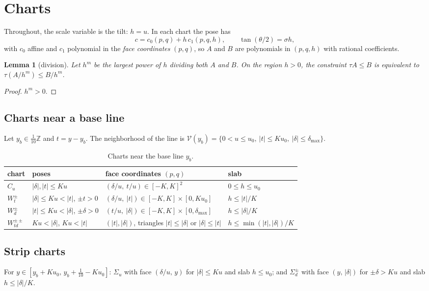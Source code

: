 \documentclass[11pt]{amsart}
\newtheorem{lemma}[theorem]{Lemma}
\theoremstyle{definition}
\theoremstyle{remark}
\newcommand{\Z}{\mathbb Z}
\begin{document}
\section{Charts}\label{sec:charts}

Throughout, the scale variable is the tilt: $h=u$. In each chart the pose has
\[
c=c_0(p,q)+h\,c_1(p,q,h),\qquad \tan(\theta/2)=\sigma h,
\]
with $c_0$ affine and $c_1$ polynomial in the \emph{face coordinates} $(p,q)$, so $A$ and $B$ are polynomials in
$(p,q,h)$ with rational coefficients.

\begin{lemma}[division]\label{lem:division}
Let $h^m$ be the largest power of $h$ dividing both $A$ and $B$. On the region $h>0$, the constraint $\tau A\le B$ is
equivalent to $\tau(A/h^m)\le B/h^m$.
\end{lemma}

\begin{proof}
$h^m>0$.
\end{proof}

\subsection{Charts near a base line}
Let $y_b\in\frac1{10}\Z$ and $t=y-y_b$. The neighborhood of the line is
$\mathcal V(y_b)=\{0<u\le u_0,\ |t|\le Ku_0,\ |\delta|\le\delta_{\max}\}$.

\begin{table}[h]
\begin{tabular}{llll}
\toprule
chart & poses & face coordinates $(p,q)$ & slab \\
\midrule
$C_u$ & $|\delta|,|t|\le Ku$ & $(\delta/u,\ t/u)\in[-K,K]^2$ & $0\le h\le u_0$\\
$W_t^\pm$ & $|\delta|\le Ku<|t|$, $\pm t>0$ & $(\delta/u,\ |t|)\in[-K,K]\times[0,Ku_0]$ & $h\le|t|/K$\\
$W_d^\pm$ & $|t|\le Ku<|\delta|$, $\pm\delta>0$ & $(t/u,\ |\delta|)\in[-K,K]\times[0,\delta_{\max}]$ & $h\le|\delta|/K$\\
$W_{td}^{\pm\pm}$ & $Ku<|\delta|$, $Ku<|t|$ & $(|t|,|\delta|)$, triangles $|t|\le|\delta|$ or $|\delta|\le|t|$ &
$h\le\min(|t|,|\delta|)/K$\\
\bottomrule
\end{tabular}
\caption{Charts near the base line $y_b$.}\label{tab:charts}
\end{table}

\subsection{Strip charts}
For $y\in[y_b+Ku_0,\,y_b+\frac1{10}-Ku_0]$: $\Sigma_u$ with face $(\delta/u,\,y)$ for $|\delta|\le Ku$ and slab $h\le u_0$;
and $\Sigma_d^\pm$ with face $(y,\,|\delta|)$ for $\pm\delta>Ku$ and slab $h\le|\delta|/K$.
\end{document}
